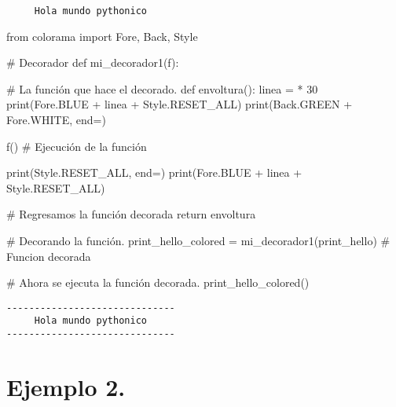 \documentclass[
  letterpaper,
  DIV=11,
  numbers=noendperiod]{scrreprt}
\newenvironment{Shaded}{\begin{snugshade}}{\end{snugshade}}
\newcommand{\BuiltInTok}[1]{\textcolor[rgb]{0.00,0.23,0.31}{#1}}
\newcommand{\CommentTok}[1]{\textcolor[rgb]{0.37,0.37,0.37}{#1}}
\newcommand{\ControlFlowTok}[1]{\textcolor[rgb]{0.00,0.23,0.31}{#1}}
\newcommand{\DecValTok}[1]{\textcolor[rgb]{0.68,0.00,0.00}{#1}}
\newcommand{\ImportTok}[1]{\textcolor[rgb]{0.00,0.46,0.62}{#1}}
\newcommand{\KeywordTok}[1]{\textcolor[rgb]{0.00,0.23,0.31}{#1}}
\newcommand{\NormalTok}[1]{\textcolor[rgb]{0.00,0.23,0.31}{#1}}
\newcommand{\OperatorTok}[1]{\textcolor[rgb]{0.37,0.37,0.37}{#1}}
\newcommand{\StringTok}[1]{\textcolor[rgb]{0.13,0.47,0.30}{#1}}
\begin{document}
\begin{verbatim}
     Hola mundo pythonico     
\end{verbatim}

\begin{Shaded}
\begin{Highlighting}[]
\ImportTok{from}\NormalTok{ colorama }\ImportTok{import}\NormalTok{ Fore, Back, Style}

\CommentTok{\# Decorador}
\KeywordTok{def}\NormalTok{ mi\_decorador1(f):}

    \CommentTok{\# La función que hace el decorado.}
    \KeywordTok{def}\NormalTok{ envoltura():}
\NormalTok{        linea }\OperatorTok{=} \StringTok{\textquotesingle{}{-}\textquotesingle{}} \OperatorTok{*} \DecValTok{30}
        \BuiltInTok{print}\NormalTok{(Fore.BLUE }\OperatorTok{+}\NormalTok{ linea }\OperatorTok{+}\NormalTok{ Style.RESET\_ALL)}
        \BuiltInTok{print}\NormalTok{(Back.GREEN }\OperatorTok{+}\NormalTok{ Fore.WHITE, end}\OperatorTok{=}\StringTok{\textquotesingle{}\textquotesingle{}}\NormalTok{)}
        
\NormalTok{        f() }\CommentTok{\# Ejecución de la función}
        
        \BuiltInTok{print}\NormalTok{(Style.RESET\_ALL, end}\OperatorTok{=}\StringTok{\textquotesingle{}\textquotesingle{}}\NormalTok{)}
        \BuiltInTok{print}\NormalTok{(Fore.BLUE }\OperatorTok{+}\NormalTok{ linea }\OperatorTok{+}\NormalTok{ Style.RESET\_ALL)}

    \CommentTok{\# Regresamos la función decorada}
    \ControlFlowTok{return}\NormalTok{ envoltura }

\CommentTok{\# Decorando la función.}
\NormalTok{print\_hello\_colored }\OperatorTok{=}\NormalTok{ mi\_decorador1(print\_hello) }\CommentTok{\# Funcion decorada}

\CommentTok{\# Ahora se ejecuta la función decorada.}
\NormalTok{print\_hello\_colored()}
\end{Highlighting}
\end{Shaded}

\begin{verbatim}
------------------------------
     Hola mundo pythonico     
------------------------------
\end{verbatim}

\section{\texorpdfstring{\textbf{Ejemplo
2.}}{Ejemplo 2.}}\label{ejemplo-2.-3}
\end{document}
